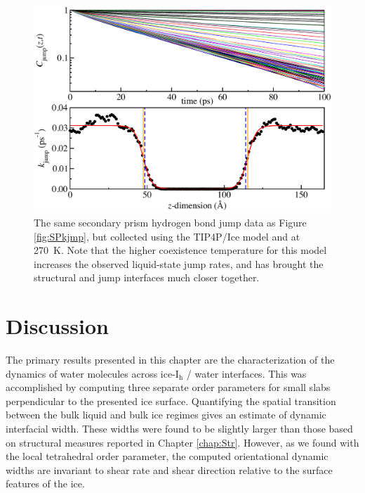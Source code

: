 \begin{figure}
\includegraphics[width=\linewidth]{Figures/secprismJumpPlotTIP4PIce}
\caption{\label{fig:SPTIP4Pkjmp} The same secondary prism hydrogen
  bond jump data as Figure \ref{fig:SPkjmp}, but collected using the
  TIP4P/Ice model and at 270~K.  Note that the higher coexistence
  temperature for this model increases the observed liquid-state jump
  rates, and has brought the structural and jump interfaces much
  closer together.}
\end{figure}


\section{Discussion}
The primary results presented in this chapter are the characterization
of the dynamics of water molecules across ice-I$_\mathrm{h}$ / water
interfaces. This was accomplished by computing three separate order
parameters for small slabs perpendicular to the presented ice
surface. Quantifying the spatial transition between the bulk liquid
and bulk ice regimes gives an estimate of dynamic interfacial
width. These widths were found to be slightly larger than those based
on structural measures reported in Chapter \ref{chap:Str}. However, as
we found with the local tetrahedral order parameter, the computed
orientational dynamic widths are invariant to shear rate and shear
direction relative to the surface features of the ice.

